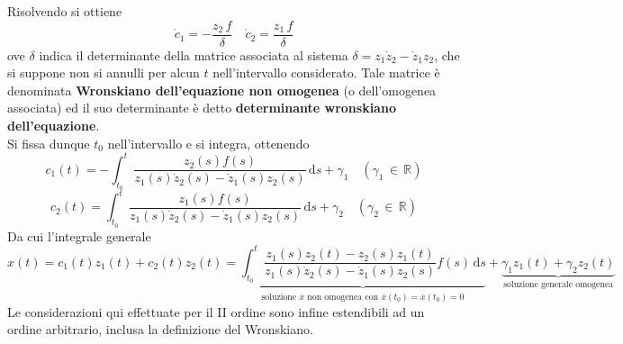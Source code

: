 \documentclass[10pt, oneside]{book}
\theoremstyle{plain}
\begin{document}
Risolvendo si ottiene
\[\dot c_1 = - \frac{z_2 \, f}{\delta} \quad \dot c_2 = \frac{z_1 \, f}{\delta}\]
ove $\delta$ indica il determinante della matrice associata al sistema $\delta = z_1 \dot z_2 - \dot z_1 z_2$, che si suppone non si annulli per alcun $t$ nell'intervallo considerato. Tale matrice è denominata \textbf{Wronskiano dell'equazione non omogenea} (o dell'omogenea associata) ed il suo determinante è detto \textbf{determinante wronskiano dell'equazione}.
\\Si fissa dunque $t_0$ nell'intervallo e si integra, ottenendo
\[c_1(t) = - \int_{t_0}^{t}\frac{z_2(s) f(s)}{z_1(s) \dot z_2 (s) - \dot z_1(s) z_2(s)}\, \textrm{d}s + \gamma_1 \quad (\gamma_1 \, \in \, \mathbb{R})\]
\[c_2(t) = \int_{t_0}^{t}\frac{z_1(s) f(s)}{z_1(s) \dot z_2 (s) - \dot z_1(s) z_2(s)}\, \textrm{d}s + \gamma_2 \quad (\gamma_2 \, \in \, \mathbb{R})\]
Da cui l'integrale generale
\[x(t) = c_1(t) z_1(t) + c_2(t) z_2(t) = \underbrace{\int_{t_0}^{t}\frac{z_1(s) z_2(t) - z_2(s) z_1(t)}{z_1(s) \dot z_2 (s) - \dot z_1(s) z_2(s)} f(s)\, \textrm{d}s}_{\displaystyle \textrm{soluzione } \overline{x} \textrm{ non omogenea con } \overline{x}(t_0) = \dot{\overline{x}}(t_0) = 0} + \underbrace{\gamma_1 z_1(t) + \gamma_2 z_2(t)}_{\displaystyle \textrm{soluzione generale omogenea}}\]
Le considerazioni qui effettuate per il II ordine sono infine estendibili ad un ordine arbitrario, inclusa la definizione del Wronskiano.
\end{document}
